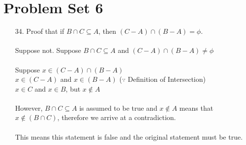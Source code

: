 \documentclass[12pt]{article}
\begin{document}
\section*{Problem Set 6}
\begin{itemize}
    \item [34.]
        Proof that if $B \cap C \subseteq A$, then $(C - A) \cap (B - A) = \phi$. \\
        \\
        Suppose not. Suppose $B \cap C \subseteq A$ and $(C - A) \cap (B - A) \neq \phi$ \\
        \\
        Suppose $x \in (C - A) \cap (B - A)$ \\
        $x \in (C - A)$ and $x \in (B - A)$ \hspace{5em} ($\because$ Definition of Intersection) \\
        $x \in C$ and $x \in B$, but $x \notin A$ \\
        \\
        However, $B \cap C \subseteq A$ is assumed to be true and $x\notin A$ means that
        $x \notin (B \cap C)$, therefore we arrive at a contradiction. \\
        \\
        This means this statement is false and the original statement must be true.

\end{itemize}
\end{document}
